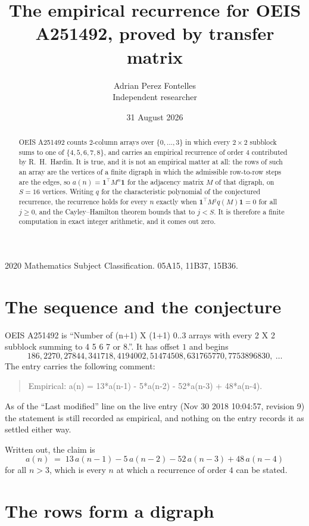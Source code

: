 \documentclass[11pt,a4paper]{article}
\title{The empirical recurrence for OEIS A251492, proved by transfer matrix}
\author{Adrian Perez Fontelles\\ \small Independent researcher}
\date{31 August 2026}
\theoremstyle{plain}
\theoremstyle{definition}
\begin{document}
\maketitle

\begin{abstract}
OEIS A251492 counts $2$-column arrays over $\{0,\dots,3\}$ in which every
$2\times2$ subblock sums to one of $\{4, 5, 6, 7, 8\}$, and carries an empirical
recurrence of order $4$ contributed by R.~H.~Hardin. It is true, and it is not an
empirical matter at all: the rows of such an array are the vertices of a finite digraph in
which the admissible row-to-row steps are the edges, so $a(n)=\mathbf{1}^{\!\top}M^{n}
\mathbf{1}$ for the adjacency matrix $M$ of that digraph, on $S=16$ vertices. Writing
$q$ for the characteristic polynomial of the conjectured recurrence, the recurrence holds
for every $n$ exactly when $\mathbf{1}^{\!\top}M^{j}q(M)\mathbf{1}=0$ for all
$j\ge0$, and the Cayley--Hamilton theorem bounds that to $j<S$. It is therefore a finite
computation in exact integer arithmetic, and it comes out zero.
\end{abstract}

\noindent\small 2020 Mathematics Subject Classification. 05A15, 11B37, 15B36.\normalsize

\section{The sequence and the conjecture}

OEIS A251492 is ``Number of (n+1) X (1+1) 0..3 arrays with every 2 X 2 subblock summing to 4 5 6 7 or 8.''. It has offset $1$
and begins
\[
186, 2270, 27844, 341718, 4194002, 51474508, 631765770, 7753896830,\ \dots
\]
The entry carries the following comment:
\begin{quote}\small
Empirical: a(n) = 13*a(n-1) - 5*a(n-2) - 52*a(n-3) + 48*a(n-4).
\end{quote}
As of the ``Last modified'' line on the live entry (Nov 30 2018 10:04:57, revision 9) the statement is
still recorded as empirical, and nothing on the entry records it as settled either way.

Written out, the claim is
\begin{equation}\label{eq:conj}
a(n)\;=\;13\,a(n-1) - 5\,a(n-2) - 52\,a(n-3) + 48\,a(n-4)
\end{equation}
for all $n>3$, which is every $n$ at which a recurrence of order $4$ can be
stated.

\section{The rows form a digraph}
\end{document}
